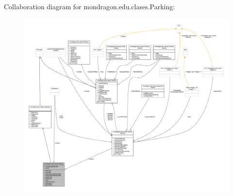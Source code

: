 Collaboration diagram for mondragon.\+edu.\+clases.\+Parking\+:
\nopagebreak
\begin{figure}[H]
\begin{center}
\leavevmode
\includegraphics[width=350pt]{classmondragon_1_1edu_1_1clases_1_1_parking__coll__graph}
\end{center}
\end{figure}
